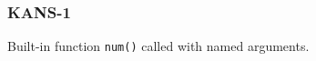 \subsubsection{KANS-1}\label{sec:error_code_kans_1}

Built-in function \texttt{num()} called with named arguments.


